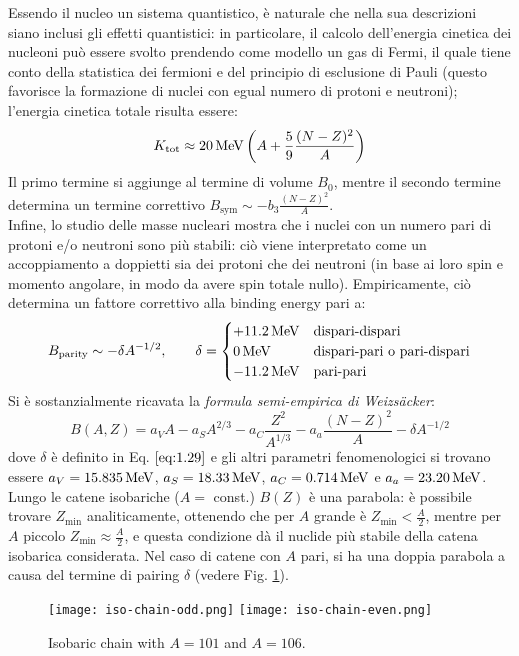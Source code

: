 Essendo il nucleo un sistema quantistico, è naturale che nella sua descrizioni siano inclusi gli effetti quantistici: in particolare, il calcolo dell'energia cinetica dei nucleoni può essere svolto prendendo come modello un gas di Fermi, il quale tiene conto della statistica dei fermioni e del principio di esclusione di Pauli (questo favorisce la formazione di nuclei con egual numero di protoni e neutroni); l'energia cinetica totale risulta essere:
\begin{equation}
	K_{\text{tot}} \approx 20 \,\mathrm{MeV} \left( A + \frac{5}{9} \frac{(N - Z)^2}{A} \right)
	\label{eq:1.28}
\end{equation}
Il primo termine si aggiunge al termine di volume $ B_0 $, mentre il secondo termine determina un termine correttivo $ B_{\text{sym}} \sim - b_3 \frac{(N - Z)^2}{A} $.\\
Infine, lo studio delle masse nucleari mostra che i nuclei con un numero pari di protoni e/o neutroni sono più stabili: ciò viene interpretato come un accoppiamento a doppietti sia dei protoni che dei neutroni (in base ai loro spin e momento angolare, in modo da avere spin totale nullo). Empiricamente, ciò determina un fattore correttivo alla binding energy pari a:
\begin{equation}
	B_{\text{parity}} \sim - \delta A^{-1/2}, \qquad \delta =
	\begin{cases}
		+11.2\,\mathrm{MeV} & \text{dispari-dispari} \\
		0\,\mathrm{MeV} & \text{dispari-pari o pari-dispari} \\
		-11.2\,\mathrm{MeV} & \text{pari-pari}
	\end{cases}
	\label{eq:1.29}
\end{equation}
Si è sostanzialmente ricavata la \textit{formula semi-empirica di Weizsäcker}:
\begin{equation}
	B(A,Z) = a_V A - a_S A^{2/3} - a_C \frac{Z^2}{A^{1/3}} - a_a \frac{(N - Z)^2}{A} - \delta A^{-1/2}
	\label{eq:1.30}
\end{equation}
dove $ \delta $ è definito in Eq. $ \ref{eq:1.29} $ e gli altri parametri fenomenologici si trovano essere $ a_V = 15.835\,\mathrm{MeV} $, $ a_S = 18.33\,\mathrm{MeV} $, $ a_C = 0.714\,\mathrm{MeV} $ e $ a_a = 23.20\,\mathrm{MeV} $.\\
Lungo le catene isobariche ($ A = $ const.) $ B(Z) $ è una parabola: è possibile trovare $ Z_{\text{min}} $ analiticamente, ottenendo che per $ A $ grande è $ Z_{\text{min}} < \frac{A}{2} $, mentre per $ A $ piccolo $ Z_{\text{min}} \approx \frac{A}{2} $, e questa condizione dà il nuclide più stabile della catena isobarica considerata. Nel caso di catene con $ A $ pari, si ha una doppia parabola a causa del termine di pairing $ \delta $ (vedere Fig. \ref{iso-chain}).
\begin{figure}[!h]
	\centering
	\texttt{[image: iso-chain-odd.png]}
	\texttt{[image: iso-chain-even.png]}
	\caption{Isobaric chain with $ A = 101 $ and $ A = 106 $.}
	\label{iso-chain}
\end{figure}

